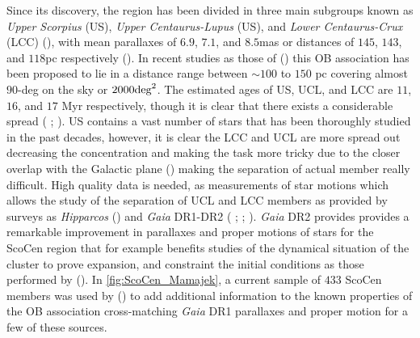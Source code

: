 Since its discovery, the region has been divided in three main subgroups known as \textit{Upper Scorpius} (US), \textit{Upper Centaurus-Lupus} (US), and \textit{Lower Centaurus-Crux} (LCC)  (\citeyear{Blaauw46}), with mean parallaxes of $6.9$, $7.1$, and $8.5$mas or distances of $145$, $143$, and $118$pc respectively  (\citeyear{2015yCat..74163108R}). In recent studies as those of  (\citeyear{2018MNRAS.tmp..210W}) this OB association has been proposed to lie in a distance range between $\sim100$ to $150$ pc covering almost $90$-deg on the sky or $2000\textnormal{deg}^2$. The estimated ages of US, UCL, and LCC are $11$, $16$, and $17$ Myr respectively, though it is clear that there exists a considerable spread ( \citeyear{1989A&A...216...44D};  \citeyear{2018MNRAS.tmp..210W}). US contains a vast number of stars that has been thoroughly studied in the past decades, however, it is clear the LCC and UCL are more spread out decreasing the concentration and making the task more tricky due to the closer overlap with the Galactic plane  (\citeyear{2015yCat..74163108R}) making the separation of actual member really difficult. High quality data is needed, as measurements of star motions which allows the study of the separation of UCL and LCC members as provided by surveys as \textit{Hipparcos}  (\citeyear{1999AJ....117..354D}) and \textit{Gaia} DR1-DR2 ( \citeyear{2012yCat..74163108R};  \citeyear{2016MNRAS.461..794P};  \citeyear{2018MNRAS.tmp..210W}). \textit{Gaia} DR2 provides provides a remarkable improvement in parallaxes and proper motions of stars for the ScoCen region that for example benefits studies of the dynamical situation of the cluster to prove expansion, and constraint the initial conditions as those performed by  (\citeyear{2018MNRAS.tmp..210W}). In \autoref{fig:ScoCen_Mamajek}, a current sample of $433$ ScoCen members was used by  (\citeyear{2018MNRAS.tmp..210W}) to add additional information to the known properties of the OB association cross-matching \textit{Gaia} DR1 parallaxes and proper motion for a few of these sources.\\   

